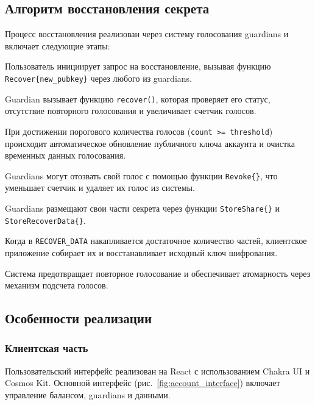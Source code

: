 \documentclass[12pt]{a&t}
\begin{document}
\subsection{Алгоритм восстановления секрета}

Процесс восстановления реализован через систему голосования guardians и включает следующие этапы:

\begin{enumlist}[.]
\item
Пользователь инициирует запрос на восстановление, вызывая функцию \texttt{Recover\{new\_pubkey\}} через любого из guardians.

\item
Guardian вызывает функцию \texttt{recover()}, которая проверяет его статус, отсутствие повторного голосования и увеличивает счетчик голосов.

\item
При достижении порогового количества голосов (\texttt{count >= threshold}) происходит автоматическое обновление публичного ключа аккаунта и очистка временных данных голосования.

\item
Guardians могут отозвать свой голос с помощью функции \texttt{Revoke\{\}}, что уменьшает счетчик и удаляет их голос из системы.

\item
Guardians размещают свои части секрета через функции \texttt{StoreShare\{\}} и \texttt{StoreRecoverData\{\}}.

\item
Когда в \texttt{RECOVER\_DATA} накапливается достаточное количество частей, клиентское приложение собирает их и восстанавливает исходный ключ шифрования.
\end{enumlist}

Система предотвращает повторное голосование и обеспечивает атомарность через механизм подсчета голосов.

\subsection{Особенности реализации}

\subsubsection{Клиентская часть}

Пользовательский интерфейс реализован на React с использованием Chakra UI и Cosmos Kit. Основной интерфейс (рис.~\ref{fig:account_interface}) включает управление балансом, guardians и данными.
\end{document}
